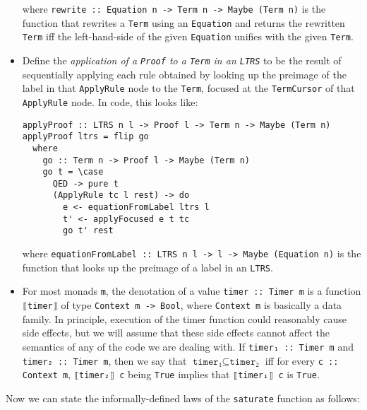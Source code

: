 \documentclass[11pt]{report}
\newcommand{\haskell}[1]{\texttt{#1}}
\begin{document}
\begin{itemize}
{  where \haskell{rewrite :: Equation n -> Term n -> Maybe (Term n)} is the
  function that rewrites a \haskell{Term} using an \haskell{Equation} and
  returns the rewritten \haskell{Term} iff the left-hand-side of the given
  \haskell{Equation} unifies with the given \haskell{Term}.
}
\item {%
  Define the
  \textit{application of a \haskell{Proof} to a \haskell{Term} in an \haskell{LTRS}}
  to be the result of sequentially applying each rule obtained by looking up
  the preimage of the label in that \haskell{ApplyRule} node to the
  \haskell{Term}, focused at the \haskell{TermCursor} of that
  \haskell{ApplyRule} node. In code, this looks like:
  \vspace{-0.5em}
  \begin{verbatim}
applyProof :: LTRS n l -> Proof l -> Term n -> Maybe (Term n)
applyProof ltrs = flip go
  where
    go :: Term n -> Proof l -> Maybe (Term n)
    go t = \case
      QED -> pure t
      (ApplyRule tc l rest) -> do
        e <- equationFromLabel ltrs l
        t' <- applyFocused e t tc
        go t' rest
  \end{verbatim}
  where \haskell{equationFromLabel :: LTRS n l -> l -> Maybe (Equation n)}
  is the function that looks up the preimage of a label in an \haskell{LTRS}.
}
\item {%
  For most monads \texttt{m}, the denotation of a value \haskell{timer :: Timer m}
  is a function \texttt{⟦\haskell{timer}⟧} of type \haskell{Context m -> Bool},
  where \haskell{Context m} is basically a data family. In principle, execution
  of the timer function could reasonably cause side effects, but we will assume
  that these side effects cannot affect the semantics of any of the code we are
  dealing with.
  If \haskell{timer₁ :: Timer m} and \haskell{timer₂ :: Timer m}, then we say
  that $\haskell{timer₁} \subseteq \haskell{timer₂}$
  iff for every \haskell{c :: Context m},
  \texttt{⟦\haskell{timer₂}⟧ \haskell{c}} being \haskell{True}
  implies that
  \texttt{⟦\haskell{timer₁}⟧ \haskell{c}} is \haskell{True}.
}
\end{itemize}

Now we can state the informally-defined laws of the \haskell{saturate} function
as follows:
\end{document}
